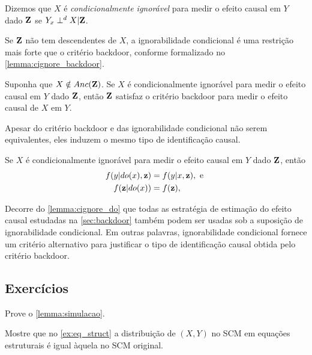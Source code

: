 \begin{definition}
 \label{def:cignore}
 Dizemos que $X$ é \textit{condicionalmente ignorável} para
 medir o efeito causal em $Y$ dado ${\mathbf{Z}}$ se
 $Y_x \perp^d X | {\mathbf{Z}}$.
\end{definition}

Se ${\mathbf{Z}}$ não tem descendentes de $X$, 
a ignorabilidade condicional é
uma restrição mais forte que o critério backdoor,
conforme formalizado no \cref{lemma:cignore_backdoor}.

\begin{lemma}
 \label{lemma:cignore_backdoor}
 Suponha que $X \notin Anc({\mathbf{Z}})$.
 Se $X$ é condicionalmente ignorável para 
 medir o efeito causal em $Y$ dado ${\mathbf{Z}}$, então
 ${\mathbf{Z}}$ satisfaz o critério backdoor para
 medir o efeito causal de $X$ em $Y$.
\end{lemma}

Apesar do critério backdoor e
das ignorabilidade condicional não serem equivalentes,
eles induzem o mesmo tipo de identificação causal.

\begin{lemma}
 \label{lemma:cignore_do}
 Se $X$ é condicionalmente ignorável para 
 medir o efeito causal em $Y$ dado ${\mathbf{Z}}$, então
 \begin{align*}
  f(y|do(x),{\mathbf{z}}) &= f(y|x,{\mathbf{z}}), \text{ e } \\
  f({\mathbf{z}}|do(x)) &= f({\mathbf{z}}),
 \end{align*}
\end{lemma}

Decorre do \cref{lemma:cignore_do} que
todas as estratégia de estimação do efeito causal
estudadas na \cref{sec:backdoor} também
podem ser usadas sob 
a suposição de ignorabilidade condicional.
Em outras palavras, 
ignorabilidade condicional fornece 
um critério alternativo para
justificar o tipo de identificação causal
obtida pelo critério backdoor. 

\subsection{Exercícios}

\begin{exercise}
 Prove o \cref{lemma:simulacao}.
\end{exercise}

\begin{exercise}
 Mostre que no \cref{ex:eq_struct} 
 a distribuição de $(X,Y)$ no SCM 
 em equações estruturais é igual 
 àquela no SCM original.
\end{exercise}

